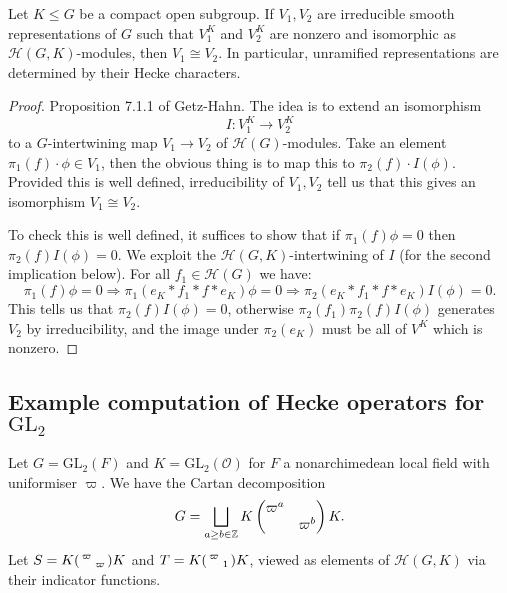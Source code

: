 \begin{prop}
    Let $K \leq G$ be a compact open subgroup. If $V_1,V_2$ are irreducible smooth representations of $G$ such that $V_1^K$ and $V_2^K$ are nonzero and isomorphic as $\mathcal H(G,K)$-modules, then $V_1 \cong V_2$. In particular, unramified representations are determined by their Hecke characters.
\end{prop}
\begin{proof}
    Proposition 7.1.1 of Getz-Hahn. The idea is to extend an isomorphism $$I: V_1^K \to V_2^K$$ to a $G$-intertwining map $V_1\to V_2$ of $\mathcal H(G)$-modules. Take an element $\pi_1(f) \cdot \phi \in V_1$, then the obvious thing is to map this to $\pi_2(f) \cdot I(\phi)$. Provided this is well defined, irreducibility of $V_1,V_2$ tell us that this gives an isomorphism $V_1 \cong V_2$.

    To check this is well defined, it suffices to show that if $\pi_1(f)\phi =0$ then $\pi_2(f)I(\phi)=0$. We exploit the $\mathcal H(G,K)$-intertwining of $I$ (for the second implication below). For all $f_1 \in \mathcal H(G)$ we have:
    $$\pi_1(f)\phi = 0 \Rightarrow \pi_1(e_K*f_1*f*e_K)\phi = 0 \Rightarrow \pi_2(e_K*f_1*f*e_K)I(\phi)=0.$$
    This tells us that $\pi_2(f)I(\phi)=0$, otherwise $\pi_2(f_1)\pi_2(f)I(\phi)$ generates $V_2$ by irreducibility, and the image under $\pi_2(e_K)$ must be all of $V^K$ which is nonzero.
\end{proof}

\subsection{Example computation of Hecke operators for $\mathrm{GL}_2$}

Let $G=\mathrm{GL}_2(F)$ and $K=\mathrm{GL}_2(\mathcal O)$ for $F$ a nonarchimedean local field with uniformiser $\varpi$. We have the Cartan decomposition $$G = \bigsqcup\limits_{a \geq b \in \mathbb{Z}} K \begin{pmatrix} \varpi^a & \\ & \varpi^b \end{pmatrix}K.$$ Let $S=K \begin{psmallmatrix} \varpi & \\ & \varpi \end{psmallmatrix}K$ and $T=K \begin{psmallmatrix} \varpi & \\ & 1 \end{psmallmatrix}K$, viewed as elements of $\mathcal H(G,K)$ via their indicator functions.

